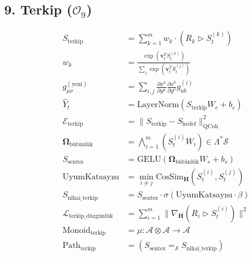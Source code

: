 \documentclass[11pt, a4paper]{article}
\begin{document}
\subsection{9. Terkip ($\mathcal{O}_9$)}
\begin{align}
S_{\text{terkip}} &= \sum_{k=1}^m w_k \cdot \left( R_k \triangleright S_t^{(k)} \right) \\
w_k &= \frac{\exp(\mathbf{v}_t^T S_t^{(k)})}{\sum_j \exp(\mathbf{v}_t^T S_t^{(j)})} \\
g_{\mu\nu}^{(\text{yeni})} &= \sum_{i,j} \frac{\partial x^a}{\partial y^\mu} \frac{\partial x^b}{\partial y^\nu} g_{ab}^{(i)} \\
\hat{Y}_t &= \text{LayerNorm}(S_{\text{terkip}} W_c + b_c) \\
\mathcal{E}_{\text{terkip}} &= \| S_{\text{terkip}} - S_{\text{hedef}} \|_{\text{QCoh}}^2 \\
\mathbf{\Omega}_{\text{bütünlük}} &= \bigwedge_{i=1}^m (S_t^{(i)} W_i) \in \Lambda^* \mathcal{S} \\
S_{\text{sentez}} &= \text{GELU}\left( \mathbf{\Omega}_{\text{bütünlük}} W_s + b_s \right) \\
\text{UyumKatsayısı} &= \min_{i \neq j} \text{CosSim}_{\mathbf{H}}(S_t^{(i)}, S_t^{(j)}) \\
S_{\text{nihai\_terkip}} &= S_{\text{sentez}} \cdot \sigma(\text{UyumKatsayısı} \cdot \beta) \\
\mathcal{L}_{\text{terkip\_düzgünlük}} &= \sum_{i=1}^m \| \nabla_{\mathbf{H}} (R_i \triangleright S_t^{(i)}) \|^2 \\
\text{Monoid}_{\text{terkip}} &= \mu : \mathcal{A} \otimes \mathcal{A} \to \mathcal{A} \\
\text{Path}_{\text{terkip}} &= (S_{\text{sentez}} =_{\mathcal{S}} S_{\text{nihai\_terkip}})
\end{align}
\end{document}
